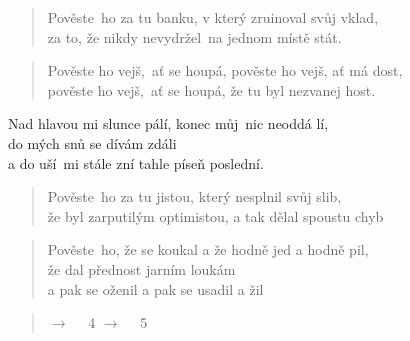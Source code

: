 \begin{song}{}
\begin{verse}
   Pověste~ho za tu banku, v který zruinoval svůj vklad, \\
   za to, že nikdy nevydržel~na jednom místě stát.
\end{verse}
\begin{verse}
   Pověste ho vejš,~ať se houpá, pověste ho vejš, ať má dost, \\
   pověste ho vejš,~ať se houpá, že tu byl nezvanej host.
\end{verse}
  \begin{refren}
    Nad hlavou mi slunce pálí, konec můj~nic neoddá lí, \\
    do mých snů se dívám zdáli \\
    a do uší~mi stále zní tahle píseň poslední.
  \end{refren}
\begin{verse}
   Pověste~ho za tu jistou, který nesplnil svůj slib, \\
   že byl zarputilým optimistou, a tak dělal spoustu chyb
\end{verse}
\begin{verse}
   Pověste~ho, že se koukal a že hodně jed a hodně pil, \\
   že dal přednost jarním loukám \\
    a pak se oženil a pak se usadil a žil
\end{verse}
\begin{verse}
   $\rightarrow$~~ 4  $\rightarrow$~~ 5
\end{verse}
\end{song}
\pagebreak

